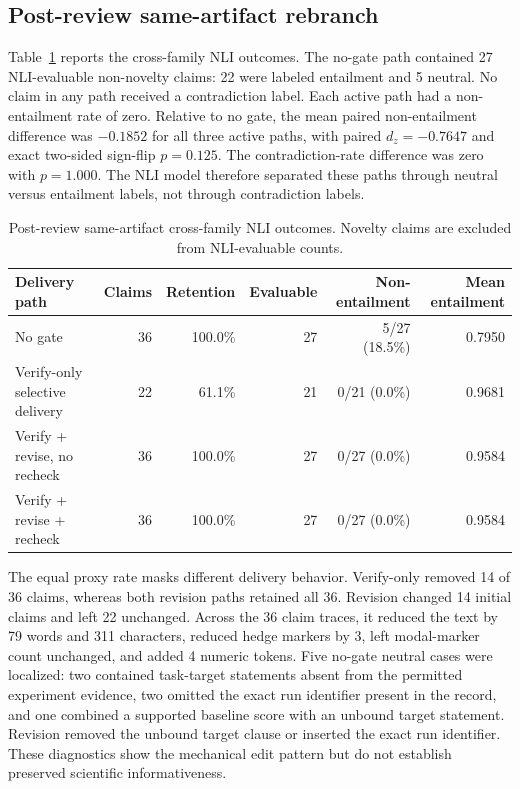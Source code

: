\documentclass[11pt]{article}
\begin{document}
\subsection{Post-review same-artifact rebranch}

Table~\ref{tab:rebranch} reports the cross-family NLI outcomes. The no-gate path contained 27 NLI-evaluable non-novelty claims: 22 were labeled entailment and 5 neutral. No claim in any path received a contradiction label. Each active path had a non-entailment rate of zero. Relative to no gate, the mean paired non-entailment difference was $-0.1852$ for all three active paths, with paired $d_z=-0.7647$ and exact two-sided sign-flip $p=0.125$. The contradiction-rate difference was zero with $p=1.000$. The NLI model therefore separated these paths through neutral versus entailment labels, not through contradiction labels.

\begin{table}[H]
\centering
\caption{Post-review same-artifact cross-family NLI outcomes. Novelty claims are excluded from NLI-evaluable counts.}
\label{tab:rebranch}
\small
\begin{tabularx}{\textwidth}{>{\raggedright\arraybackslash}X r r r r r}
\toprule
Delivery path & Claims & Retention & Evaluable & Non-entailment & Mean entailment \\
\midrule
No gate & 36 & 100.0\% & 27 & 5/27 (18.5\%) & 0.7950 \\
Verify-only selective delivery & 22 & 61.1\% & 21 & 0/21 (0.0\%) & 0.9681 \\
Verify + revise, no recheck & 36 & 100.0\% & 27 & 0/27 (0.0\%) & 0.9584 \\
Verify + revise + recheck & 36 & 100.0\% & 27 & 0/27 (0.0\%) & 0.9584 \\
\bottomrule
\end{tabularx}
\end{table}

The equal proxy rate masks different delivery behavior. Verify-only removed 14 of 36 claims, whereas both revision paths retained all 36. Revision changed 14 initial claims and left 22 unchanged. Across the 36 claim traces, it reduced the text by 79 words and 311 characters, reduced hedge markers by 3, left modal-marker count unchanged, and added 4 numeric tokens. Five no-gate neutral cases were localized: two contained task-target statements absent from the permitted experiment evidence, two omitted the exact run identifier present in the record, and one combined a supported baseline score with an unbound target statement. Revision removed the unbound target clause or inserted the exact run identifier. These diagnostics show the mechanical edit pattern but do not establish preserved scientific informativeness.
\end{document}
